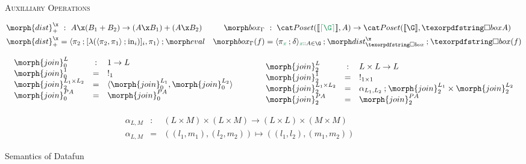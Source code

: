 \begin{figure*}
  \textsc{Auxilliary Operations}

  \begin{align*}
    \morph{dist}^\x_+ &~:~ A \x (B_1 + B_2) \to (A \x B_1) + (A \x B_2)
    &
    \mkbox_\Gamma &~:~ \Poset(\den{\stripcx \G}, A) \to \Poset(\den{\G}, \iso A) \\
    \morph{dist}^\x_+ &= \fork{\pi_2 \then \krof{\lambda (\fork{\pi_2,\pi_1} \then \injc_i)}_i, \pi_1}
    \then \eval
    &
    \mkbox_\Gamma(f) &= \fork{\pi_{\dvar x} \then \delta}_{\hd x A \in \G} \then \isox \then \iso(f)
  \end{align*}


  \begin{displaymath}
    \begin{array}{ll}
      \begin{array}{lcl }
        \morph{join}^{L}_0 & : & 1 \to L \\
        \morph{join}^1_0 & = & !_{1} \\ 
        \morph{join}^{L_1 \times L_2}_2 & = & \fork{\morph{join}^{L_1}_0, \morph{join}^{L_2}_0} \\ 
        \morph{join}^{\pfinof A}_0 & = & \morph{join}^{\pfinof A}_0 \\[1em]
      \end{array} 
      \qquad &
      \begin{array}{lcl}
        \morph{join}^{L}_2 & : & L \times L \to L \\
        \morph{join}^1_2 & = & !_{1 \times 1} \\ 
        \morph{join}^{L_1 \times L_2}_2 & = & \alpha_{L_1, L_2} \then \morph{join}^{L_1}_2 \times \morph{join}^{L_2}_2 \\
        \morph{join}^{\pfinof A}_2 & = & \morph{join}^{\pfinof A}_2 \\ 
      \end{array}
    \end{array}
  \end{displaymath}
  \begin{displaymath}
    \begin{array}{lcl}
      \alpha_{L,M} & : & (L \times M) \times (L \times M) \to (L \times L) \times (M \times M) \\ 
      \alpha_{L,M} & = & ((l_1, m_1), (l_2, m_2)) \mapsto ((l_1, l_2), (m_1, m_2)) 
    \end{array}
  \end{displaymath}

  \caption{Semantics of Datafun}
  \label{fig:semantics}\label{def:strip}
\end{figure*}
